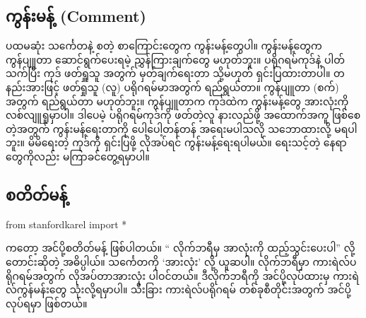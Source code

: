\subsection*{ကွန်းမန့် (Comment)}
ပထမဆုံး \fCode{\textit{\#}} သင်္ကေတနဲ့ စတဲ့ စာကြောင်းတွေက ကွန်းမန့်တွေပါ။ ကွန်းမန့်တွေက ကွန်ပျူတာ ဆောင်ရွက်ပေးရမဲ့ ညွှန်ကြားချက်တွေ မဟုတ်ဘူး။ ပရိုဂရမ်ကုဒ်နဲ့ ပါတ်သက်ပြီး ကုဒ် ဖတ်ရှူသူ အတွက် မှတ်ချက်ရေးတာ သို့မဟုတ် ရှင်းပြထားတာပါ။ တနည်းအားဖြင့် ဖတ်ရှုသူ (လူ) ပရိုဂရမ်မာအတွက် ရည်ရွယ်တာ။ ကွန်ပျူတာ (စက်) အတွက် ရည်ရွယ်တာ မဟုတ်ဘူး။ ကွန်ပျူတာက ကုဒ်ထဲက ကွန်းမန့်တွေ အားလုံးကို လစ်လျူရှုမှာပါ။ ဒါပေမဲ့ ပရိုဂရမ်ကုဒ်ကို ဖတ်တဲ့လူ နားလည်ဖို့ အထောက်အကူ ဖြစ်စေတဲ့အတွက် ကွန်းမန့်ရေးတာကို ပေါ့ပေါ့တန်တန် အရေးမပါသလို သဘောထားလို့ မရပါဘူး။ မိမိရေးတဲ့ ကုဒ်ကို ရှင်းပြဖို့ လိုအပ်ရင် ကွန်းမန့်ရေးရပါမယ်။ ရေးသင့်တဲ့ နေရာတွေကိုလည်း မကြာခင်တွေ့ရမှာပါ။

\subsection*{ စတိတ်မန့်}
%
\begin{py}
from stanfordkarel import *
\end{py}
%
ကတော့ အင်ပို့စတိတ်မန့် ဖြစ်ပါတယ်။ “ လိုက်ဘရီမှ အာလုံးကို ထည့်သွင်းပေးပါ” လို့ တောင်းဆိုတဲ့ အဓိပ္ပါယ်။ \fCode{*} သင်္ကေတကို ‘အားလုံး’ လို့ ယူဆပါ။   လိုက်ဘရီမှာ ကားရဲလ်ပရိုဂရမ်အတွက် လိုအပ်တာအားလုံး   ပါဝင်တယ်။  ဒီလိုက်ဘရီကို အင်ပို့လုပ်ထားမှ ကားရဲလ်ကွန်မန်းတွေ သုံးလို့ရမှာပါ။ သီးခြား ကားရဲလ်ပရိုဂရမ် တစ်ခုစီတိုင်းအတွက် အင်ပို့လုပ်ရမှာ ဖြစ်တယ်။

